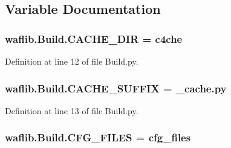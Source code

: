 \subsection{Variable Documentation}
\subsubsection[{\texorpdfstring{C\+A\+C\+H\+E\+\_\+\+D\+IR}{CACHE_DIR}}]{ waflib.\+Build.\+C\+A\+C\+H\+E\+\_\+\+D\+IR = \textquotesingle{}c4che\textquotesingle{}}\hypertarget{namespacewaflib_1_1_build_a516d816b5ed5a46f2b18427791697eef}{}\label{namespacewaflib_1_1_build_a516d816b5ed5a46f2b18427791697eef}


Definition at line 12 of file Build.\+py.

\subsubsection[{\texorpdfstring{C\+A\+C\+H\+E\+\_\+\+S\+U\+F\+F\+IX}{CACHE_SUFFIX}}]{ waflib.\+Build.\+C\+A\+C\+H\+E\+\_\+\+S\+U\+F\+F\+IX = \textquotesingle{}\+\_\+cache.\+py\textquotesingle{}}\hypertarget{namespacewaflib_1_1_build_ad3ee29dba28fdd9f8d2f0da925702ece}{}\label{namespacewaflib_1_1_build_ad3ee29dba28fdd9f8d2f0da925702ece}


Definition at line 13 of file Build.\+py.

\subsubsection[{\texorpdfstring{C\+F\+G\+\_\+\+F\+I\+L\+ES}{CFG_FILES}}]{ waflib.\+Build.\+C\+F\+G\+\_\+\+F\+I\+L\+ES = \textquotesingle{}cfg\+\_\+files\textquotesingle{}}\hypertarget{namespacewaflib_1_1_build_ada90f5b2a5f081bebb0c21bf650005d3}{}\label{namespacewaflib_1_1_build_ada90f5b2a5f081bebb0c21bf650005d3}



